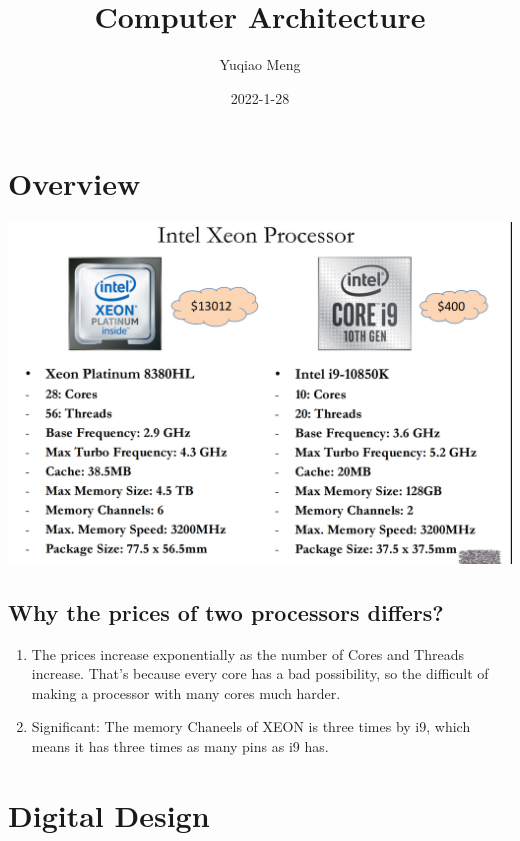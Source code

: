 \documentclass[12pt]{article}
\title{Computer Architecture}
\author{Yuqiao Meng}
\date{2022-1-28}
\begin{document}
\maketitle

\newpage
\tableofcontents

\newpage

\section{Overview}
\includegraphics[width=\textwidth]{ProcessorOverview.png}
\subsection{Why the prices of two processors differs?}
\begin{enumerate}
    \item The prices increase exponentially as the number of Cores and Threads increase. That's because every core has a bad possibility, so the difficult of making a processor with many cores much harder.
    \item Significant: The memory Chaneels of XEON is three times by i9, which means it has three times as many pins as i9 has.
\end{enumerate}

\section{Digital Design}
\end{document}
